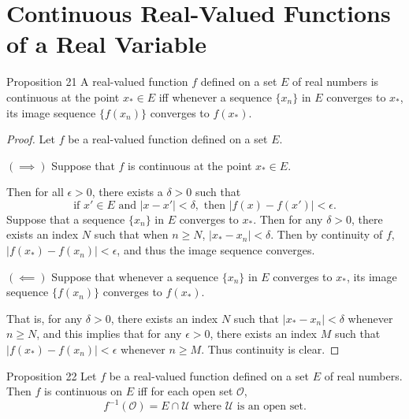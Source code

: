 \section{Continuous Real-Valued Functions of a Real Variable}
\begin{flushleft}

\begin{namedthm*}{Proposition 21}
	A real-valued function $f$ defined on a set $E$ of real numbers is continuous at the point $x_*\in E$ iff 
	whenever a sequence $\{x_n\}$ in $E$ converges to $x_*$, its image sequence $\{f(x_n)\}$ converges to $f(x_*)$.
\end{namedthm*}
\begin{proof}
	Let $f$ be a real-valued function defined on a set $E$.\par
		$(\implies)$ Suppose that $f$ is continuous at the point $x_*\in E$.\par
		Then for all $\epsilon>0$, there exists a $\delta>0$ such that 
		\[
			\text{if } x'\in E\text{ and }|x-x'|<\delta,\text{ then }|f(x)-f(x')|<\epsilon.
		\]
		Suppose that a sequence $\{x_n\}$ in $E$ converges to $x_*$. 
		Then for any $\delta>0$, there exists an index $N$ such that when $n\ge N$, $|x_*-x_n|<\delta$.
		Then by continuity of $f$, $|f(x_*)-f(x_n)|<\epsilon$, and thus the image sequence converges.\par
		$(\impliedby)$ Suppose that whenever a sequence $\{x_n\}$ in $E$ converges to $x_*$, its image sequence $\{f(x_n)\}$ converges to $f(x_*)$.\par
		That is, for any $\delta>0$, there exists an index $N$ such that $|x_*-x_n|<\delta$ whenever $n\ge N$, 
		and this implies that for any $\epsilon>0$, there exists an index $M$ such that $|f(x_*)-f(x_n)|<\epsilon$ whenever $n\ge M$.
		Thus continuity is clear.
\end{proof}

\begin{namedthm*}{Proposition 22}
	Let $f$ be a real-valued function defined on a set $E$ of real numbers.
	Then $f$ is continuous on $E$ iff for each open set $\mathcal{O}$,
	\[
	f^{-1}(\mathcal{O})=E \cap \mathcal{U}\text{ where }\mathcal{U}\text{ is an open set.}	
	\]
\end{namedthm*}


\end{flushleft}
